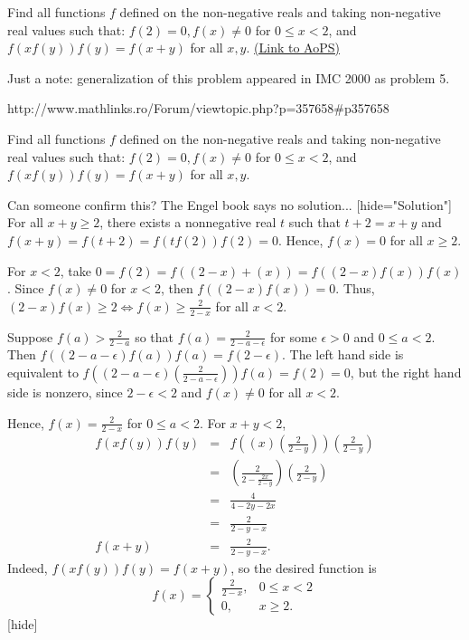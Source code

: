 \begin{problem}
	Find all functions $f$ defined on the non-negative reals and taking non-negative real values such that: $f(2)=0,f(x)\ne0$ for $0\le x<2$, and $f(xf(y))f(y)=f(x+y)$ for all $x,y$.
	\flushright \href{https://artofproblemsolving.com/community/c6h60776}{(Link to AoPS)}
\end{problem}



\begin{solution}
	Just a note: generalization of this problem appeared in IMC 2000 as problem 5.

http://www.mathlinks.ro/Forum/viewtopic.php?p=357658#p357658
\end{solution}



\begin{solution}
	\begin{tcolorbox}Find all functions $f$ defined on the non-negative reals and taking non-negative real values such that: $f(2)=0,f(x)\ne0$ for $0\le x<2$, and $f(xf(y))f(y)=f(x+y)$ for all $x,y$.\end{tcolorbox}Can someone confirm this? The Engel book says no solution...
[hide="Solution"]
For all $x+y\ge2$, there exists a nonnegative real $t$ such that $t+2=x+y$ and $f(x+y)=f(t+2)=f(tf(2))f(2)=0$. Hence, $f(x)=0$ for all $x\ge 2$.

For $x<2$, take $0=f(2)=f((2-x)+(x))=f((2-x)f(x))f(x)$.
Since $f(x)\neq0$ for $x<2$, then $f((2-x)f(x))=0$.
Thus, $(2-x)f(x)\ge2\Leftrightarrow f(x)\ge\frac{2}{2-x}$ for all $x<2$.

Suppose $f(a)>\frac{2}{2-a}$ so that $f(a)=\frac{2}{2-a-\epsilon}$ for some $\epsilon>0$ and $0\le a<2$.
Then $f\left((2-a-\epsilon)f(a)\right)f(a)=f(2-\epsilon)$. The left hand side is equivalent to $f\left((2-a-\epsilon)\left(\frac{2}{2-a-\epsilon}\right)\right)f(a)=f(2)=0$, but the right hand side is nonzero, since $2-\epsilon<2$ and $f(x)\neq0$ for all $x<2$.

Hence, $f(x)=\frac{2}{2-x}$ for $0\le a<2$.
For $x+y<2$, \begin{eqnarray*}f(xf(y))f(y) &=& f\left((x)\left(\frac{2}{2-y}\right)\right)\left(\frac{2}{2-y}\right)\\ &=&\left(\frac{2}{2-\frac{2x}{2-y}}\right)\left(\frac{2}{2-y}\right)\\ &=&\frac{4}{4-2y-2x}\\ &=&\frac{2}{2-y-x}\\ f(x+y)&=&\frac{2}{2-y-x}.\end{eqnarray*}
Indeed, $f(xf(y))f(y)=f(x+y)$, so the desired function is \[ \begin{equation*}f(x)=\begin{cases}\frac{2}{2-x},& 0\le x<2\\0,& x\ge2.\end{cases}\end{equation*}  \][\/hide]
\end{solution}



